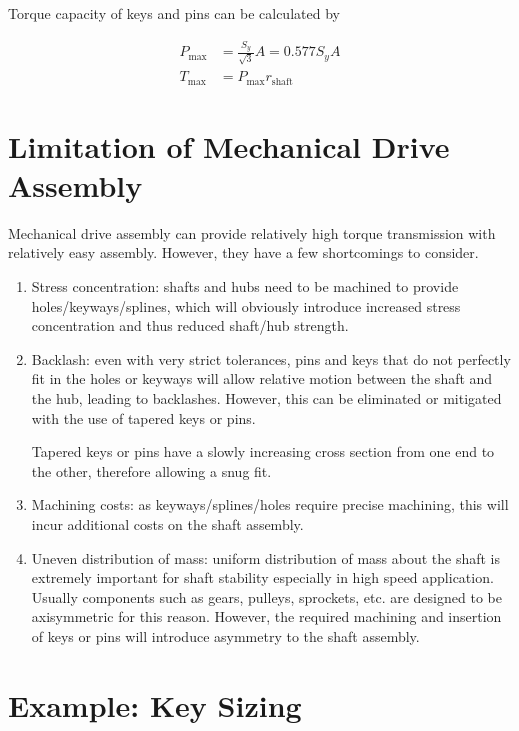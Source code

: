 \documentclass[a4paper,openany]{tufte-book}
\begin{document}
Torque capacity of keys and pins can be calculated by

\begin{align*}
  P_{\max} &= \frac{S_{y}}{\sqrt{3}}A = 0.577 S_{y}A \\
  T_{\max} &= P_{\max}r_{\text{shaft}}
\end{align*}

\section{Limitation of Mechanical Drive Assembly}
\label{sec:org0d6d284}

Mechanical drive assembly can provide relatively high torque transmission with relatively easy assembly. However, they have a few shortcomings to consider.

\begin{enumerate}
\item Stress concentration: shafts and hubs need to be machined to provide holes/keyways/splines, which will obviously introduce increased stress concentration and thus reduced shaft/hub strength.

\item Backlash: even with very strict tolerances, pins and keys that do not perfectly fit in the holes or keyways will allow relative motion between the shaft and the hub, leading to backlashes. However, this can be eliminated or mitigated with the use of tapered keys or pins.

Tapered keys or pins have a slowly increasing cross section from one end to the other, therefore allowing a snug fit.

\item Machining costs: as keyways/splines/holes require precise machining, this will incur additional costs on the shaft assembly.

\item Uneven distribution of mass: uniform distribution of mass about the shaft is extremely important for shaft stability especially in high speed application. Usually components such as gears, pulleys, sprockets, etc. are designed to be axisymmetric for this reason. However, the required machining and insertion of keys or pins will introduce asymmetry to the shaft assembly.
\end{enumerate}

\section{Example: Key Sizing}
\label{sec:orgc1bbea9}
\end{document}
